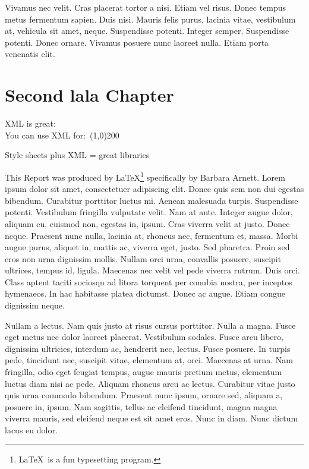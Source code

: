 \documentclass[12pt]{report}
\begin{document}
Vivamus nec velit. Cras placerat tortor a nisi. Etiam vel risus. Donec tempus metus fermentum sapien. Duis nisi. Mauris felis purus, lacinia vitae, vestibulum at, vehicula sit amet, neque. Suspendisse potenti. Integer semper. Suspendisse potenti. Donec ornare. Vivamus posuere nunc laoreet nulla. Etiam porta venenatis elit.


\chapter{Second lala Chapter}
XML is great:\\
You can use XML for:\
\line(1,0){200}
\vspace{8 mm}\

Style sheets plus XML = great libraries

This Report was produced by LaTeX\footnote {\LaTeX\ is a fun typesetting program.} specifically by Barbara Arnett.
Lorem ipsum dolor sit amet, consectetuer adipiscing elit. Donec quis sem non dui egestas bibendum. Curabitur porttitor luctus mi. Aenean malesuada turpis. Suspendisse potenti. Vestibulum fringilla vulputate velit. Nam at ante. Integer augue dolor, aliquam eu, euismod non, egestas in, ipsum. Cras viverra velit at justo. Donec neque. Praesent nunc nulla, lacinia at, rhoncus nec, fermentum et, massa. Morbi augue purus, aliquet in, mattis ac, viverra eget, justo. Sed pharetra. Proin sed eros non urna dignissim mollis. Nullam orci urna, convallis posuere, suscipit ultrices, tempus id, ligula. Maecenas nec velit vel pede viverra rutrum. Duis orci. Class aptent taciti sociosqu ad litora torquent per conubia nostra, per inceptos hymenaeos. In hac habitasse platea dictumst. Donec ac augue. Etiam congue dignissim neque.

%

Nullam a lectus. Nam quis justo at risus cursus porttitor. Nulla a magna. Fusce eget metus nec dolor laoreet placerat. Vestibulum sodales. Fusce arcu libero, dignissim ultricies, interdum ac, hendrerit nec, lectus. Fusce posuere. In turpis pede, tincidunt nec, suscipit vitae, elementum at, orci. Maecenas at urna. Nam fringilla, odio eget feugiat tempus, augue mauris pretium metus, elementum luctus diam nisi ac pede. Aliquam rhoncus arcu ac lectus. Curabitur vitae justo quis urna commodo bibendum. Praesent nunc ipsum, ornare sed, aliquam a, posuere in, ipsum. Nam sagittis, tellus ac eleifend tincidunt, magna magna viverra mauris, sed eleifend neque est sit amet eros. Nunc in diam. Nunc dictum lacus eu dolor.
\end{document}
